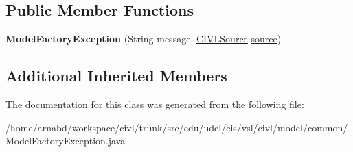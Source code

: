 \subsection*{Public Member Functions}
\begin{DoxyCompactItemize}
\item 
\hypertarget{classedu_1_1udel_1_1cis_1_1vsl_1_1civl_1_1model_1_1common_1_1ModelFactoryException_a7aafd3b295ad52c3e40d87e8906f67cb}{}{\bfseries Model\+Factory\+Exception} (String message, \hyperlink{interfaceedu_1_1udel_1_1cis_1_1vsl_1_1civl_1_1model_1_1IF_1_1CIVLSource}{C\+I\+V\+L\+Source} \hyperlink{classedu_1_1udel_1_1cis_1_1vsl_1_1civl_1_1model_1_1IF_1_1CIVLException_a29eba9d3541bcd7e2306404c6ece4d98}{source})\label{classedu_1_1udel_1_1cis_1_1vsl_1_1civl_1_1model_1_1common_1_1ModelFactoryException_a7aafd3b295ad52c3e40d87e8906f67cb}

\end{DoxyCompactItemize}
\subsection*{Additional Inherited Members}


The documentation for this class was generated from the following file\+:\begin{DoxyCompactItemize}
\item 
/home/arnabd/workspace/civl/trunk/src/edu/udel/cis/vsl/civl/model/common/Model\+Factory\+Exception.\+java\end{DoxyCompactItemize}
